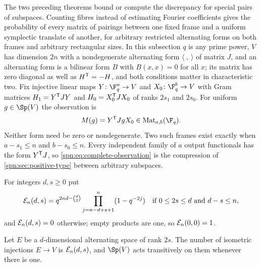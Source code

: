 The two preceding theorems bound or compute the discrepancy for special pairs
of subspaces. Counting fibres instead of estimating Fourier coefficients gives
the probability of every matrix of pairings between one fixed frame and a
uniform symplectic translate of another, for arbitrary restricted alternating
forms on both frames and arbitrary rectangular sizes. In this subsection $q$
is any prime power, $V$ has dimension $2n$ with a nondegenerate alternating
form $\langle\ ,\ \rangle$ of matrix $J$, and an alternating form is a bilinear
form $B$ with $B(x,x)=0$ for all $x$; its matrix has zero diagonal as well as
$H^{\mathsf{T}}=-H$, and both conditions matter in characteristic two. Fix injective
linear maps $Y\colon\F_q^a\to V$ and $X_0\colon\F_q^b\to V$ with Gram matrices
$H_1=Y^{\mathsf{T}}JY$ and $H_0=X_0^{\mathsf{T}}JX_0$ of ranks $2s_1$ and $2s_0$. For
uniform $g\in\Sp(V)$ the observation is
\begin{equation}\label{spn:eq:complete-observation}
 M(g)=Y^{\spnT}JgX_0\in\spnMat_{a,b}(\F_q).
\end{equation}
Neither form need be zero or nondegenerate. Two such frames exist exactly when
$a-s_1\le n$ and $b-s_0\le n$. Every independent family of $a$ output
functionals has the form $Y^{\mathsf{T}}J$, so \eqref{spn:eq:complete-observation}
is the compression of \cref{spn:sec:positive-type} between arbitrary
subspaces.

For integers $d,s\ge0$ put
\begin{equation}\label{spn:eq:E-count}
 \mathcal{E}_n(d,s)=q^{2nd-\binom d2}\prod_{j=n-d+s+1}^{n}(1-q^{-2j})
 \quad\text{if }0\le2s\le d\text{ and }d-s\le n,
\end{equation}
and $\mathcal{E}_n(d,s)=0$ otherwise; empty products are one, so
$\mathcal{E}_n(0,0)=1$.

\begin{lemma}\label{spn:lem:gram-frames}
Let $E$ be a $d$-dimensional alternating space of rank $2s$. The number of
isometric injections $E\to V$ is $\mathcal{E}_n(d,s)$, and $\Sp(V)$ acts
transitively on them whenever there is one.
\end{lemma}

